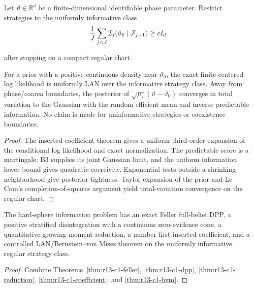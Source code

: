 Let $\vartheta\in\mathbb R^d$ be a finite-dimensional identifiable phase
parameter.  Restrict strategies to the uniformly informative class
\[
 {1\over J}\sum_{j<J}
 \mathcal I_j(\vartheta_0\mid\mathcal F_{j-1})
 \ge cI_d
\]

after stopping on a compact regular chart.

\begin{theorem}
\label{thm:r13-c1-bvm}
For a prior with a positive continuous density near $\vartheta_0$, the exact
finite-centered log likelihood is uniformly LAN over the informative strategy
class.  Away from phase/coarea boundaries, the posterior of
$\sqrt{\mu_\varepsilon}(\vartheta-\vartheta_0)$ converges in total variation
to the Gaussian with the random efficient mean and inverse predictable
information.  No claim is made for uninformative strategies or coexistence
boundaries.
\end{theorem}

\begin{proof}
The inserted coefficient theorem gives a uniform third-order expansion of the
conditional log likelihood and exact normalization.  The predictable score is
a martingale; B3 supplies its joint Gaussian limit, and the uniform information
lower bound gives quadratic coercivity.  Exponential tests outside a shrinking
neighborhood give posterior tightness.  Taylor expansion of the prior and
Le Cam's completion-of-squares argument yield total-variation convergence on
the regular chart.
\end{proof}

\begin{theorem}
\label{thm:r13-c1-main}
The hard-sphere information problem has an exact Feller full-belief DPP, a
positive stratified disintegration with a continuous zero-evidence cone, a
quantitative growing-moment reduction, a number-first inserted coefficient,
and a controlled LAN/Bernstein--von Mises theorem on the uniformly informative
regular strategy class.
\end{theorem}

\begin{proof}
Combine Theorems~\ref{thm:r13-c1-feller},
\ref{thm:r13-c1-dpp}, \ref{thm:r13-c1-reduction},
\ref{thm:r13-c1-coefficient}, and \ref{thm:r13-c1-bvm}.
\end{proof}
